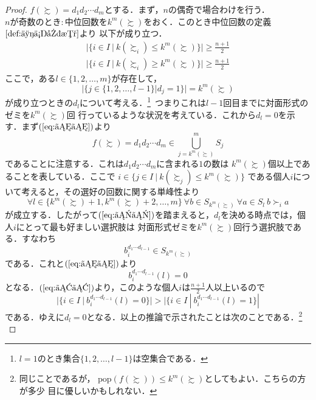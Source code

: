 \documentclass[dvipdfmx]{jsarticle}
\begin{document}
\begin{proof}
  $f(\succsim) = d_{1}d_{2}\cdots d_{m}$とする．まず，$n$の偶奇で場合わけを行う．\\
  $n$が奇数のとき$\colon$中位回数を$k^m(\succsim)$をおく．このとき中位回数の定義~$\ref{def:中位回数}$より
  以下が成り立つ．
  \begin{gather}
    |\{ i \in I \ | \ k(\succsim_i) \leq k^{m}(\succsim) \}|  \geq \frac{n+1}{2} \label{eq:ああ}\\ 
    |\{ i \in I \ | \ k(\succsim_i) \geq k^{m}(\succsim) \}|  \geq \frac{n+1}{2} \label{eq:いい}
  \end{gather}
  ここで，ある$l \in \{1,2,\ldots,m\}$が存在して，
  \begin{equation}\label{eq:うう}
    |\{ j \in \{1,2,\ldots,l-1\} | d_j = 1 \}| = k^{m}(\succsim)
  \end{equation}
  が成り立つときの$d_l$について考える．\<\footnote{$l=1$のとき集合$\{1,2,\ldots,l-1\}$は空集合である．}\
  つまりこれは$l-1$回目までに対面形式のゼミを$k^{m}(\succsim)$回
  行っているような状況を考えている．これから$d_l=0$を示す．まず$(\ref{eq:うう})$より
  \begin{equation}\label{eq:かか}
    f(\succsim) = d_{1}d_{2}\cdots d_{m} \in \bigcup_{j=k^{m}(\succsim)}^{m}S_j
  \end{equation}
  であることに注意する．これは$d_{1}d_{2}\cdots d_{m}$に含まれる$1$の数は
  $k^{m}(\succsim)$個以上であることを表している．ここで
  \mbox{$i \in \{j \in I \ | \ k(\succsim_j) \leq k^{m}(\succsim) \}$}
  である個人$i$について考えると，その選好の回数に関する単峰性より
  \[
    \forall l \in \{k^m(\succsim)+1,k^m(\succsim)+2, \ldots, m\} \ \forall b \in S_{k^m(\succsim)}
    \ \forall a \in S_l \ b \succ_i a
  \]
  が成立する．したがって$(\ref{eq:かか})$を踏まえると，$d_l$を決める時点では，個人$i$にとって最も好ましい選択肢は
  対面形式ゼミを$k^m(\succsim)$回行う選択肢である．すなわち
  \[
    b_{i}^{d_{1}\cdots d_{l-1}} \in S_{k^m(\succsim)}
  \]
  である．これと$(\ref{eq:うう})$より
  \[
    b_{i}^{d_{1}\cdots d_{l-1}}(l) = 0
  \]
  となる．$(\ref{eq:ああ})$より，このような個人$i$は$\frac{n+1}{2}$人以上いるので
  \[
    |\{i \in I \ | \ b_{i}^{d_{1}\cdots d_{l-1}}(l) = 0 \}| >
    |\{i \in I \ | \ b_{i}^{d_{1}\cdots d_{l-1}}(l) = 1 \}|
  \]
  である．ゆえに$d_l=0$となる．以上の推論で示されたことは次のことである．\<\footnote{同じことであるが，
  $\mathrm{pop}(f(\succsim)) \leq k^m(\succsim)$としてもよい．こちらの方が多少
  目に優しいかもしれない．}\
  \begin{equation}\label{eq:A}

\end{equation}
\end{proof}
\end{document}
